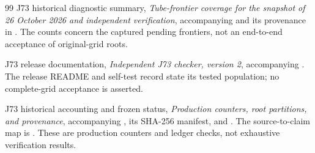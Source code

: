 \begin{thebibliography}{99}
 J73 historical diagnostic summary,
\emph{Tube-frontier coverage for the snapshot of 26 October 2026
and independent verification}, accompanying
 and its provenance in
.
The counts concern the captured pending frontiers, not an end-to-end
acceptance of original-grid roots.

 J73 release documentation,
\emph{Independent J73 checker, version 2}, accompanying
. The release README and self-test record state
its tested population; no complete-grid acceptance is asserted.

 J73 historical accounting and frozen status,
\emph{Production counters, root partitions, and provenance},
accompanying , its SHA-256 manifest,
and .
The source-to-claim map is .
These are production counters and ledger checks, not exhaustive
verification results.
\end{thebibliography}
